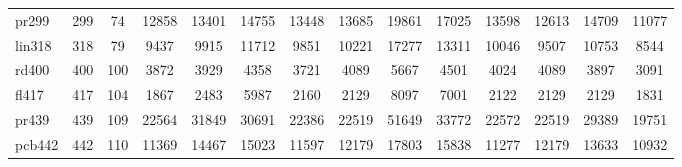 \documentclass[conference]{IEEEtran}
\begin{document}
\begin{table}[htbp]
{{\begin{tabular}{|l|c|c|c|c|c|c|c|c|c|c|c|c|c|}
pr299 & 299 & 74 & 12858 & 13401 & 14755 & 13448 & 13685 & 19861 & 17025 & 13598 & 12613 & 14709 & 11077 \\
lin318 & 318 & 79 & 9437 & 9915 & 11712 & 9851 & 10221 & 17277 & 13311 & 10046 & 9507 & 10753 & 8544 \\
rd400 & 400 & 100 & 3872 & 3929 & 4358 & 3721 & 4089 & 5667 & 4501 & 4024 & 4089 & 3897 & 3091 \\
fl417 & 417 & 104 & 1867 & 2483 & 5987 & 2160 & 2129 & 8097 & 7001 & 2122 & 2129 & 2129 & 1831 \\
pr439 & 439 & 109 & 22564 & 31849 & 30691 & 22386 & 22519 & 51649 & 33772 & 22572 & 22519 & 29389 & 19751 \\
pcb442 & 442 & 110 & 11369 & 14467 & 15023 & 11597 & 12179 & 17803 & 15838 & 11277 & 12179 & 13633 & 10932 \\
\hline
\end{tabular}}}
\end{table}
\end{document}
